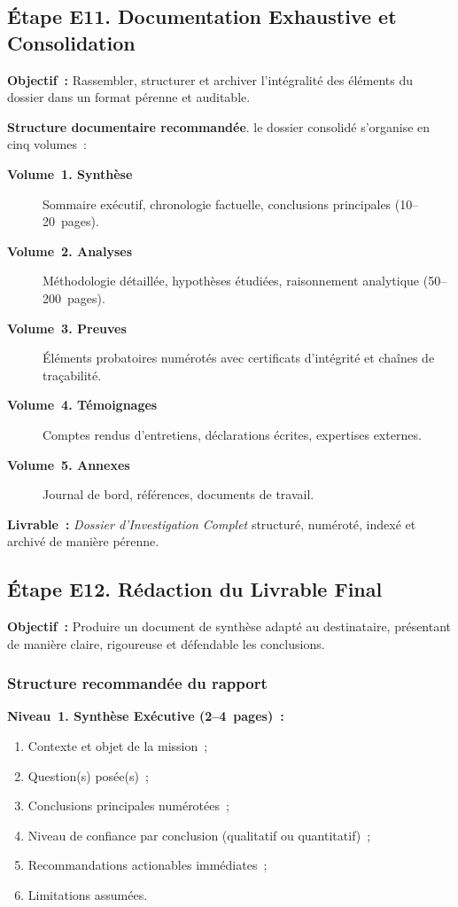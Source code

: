 \subsection{Étape E11. Documentation Exhaustive et Consolidation}

\textbf{Objectif~:} Rassembler, structurer et archiver l'intégralité des
éléments du dossier dans un format pérenne et auditable.

\textbf{Structure documentaire recommandée}. le dossier consolidé
s'organise en cinq volumes~:
\begin{description}
    \item[\textbf{Volume~1. Synthèse}] Sommaire exécutif, chronologie
          factuelle, conclusions principales (10--20~pages).
    \item[\textbf{Volume~2. Analyses}] Méthodologie détaillée, hypothèses
          étudiées, raisonnement analytique (50--200~pages).
    \item[\textbf{Volume~3. Preuves}] Éléments probatoires numérotés avec
          certificats d'intégrité et chaînes de traçabilité.
    \item[\textbf{Volume~4. Témoignages}] Comptes rendus d'entretiens,
          déclarations écrites, expertises externes.
    \item[\textbf{Volume~5. Annexes}] Journal de bord, références,
          documents de travail.
\end{description}

\textbf{Livrable~:} \textit{Dossier d'Investigation Complet} structuré,
numéroté, indexé et archivé de manière pérenne.

\subsection{Étape E12. Rédaction du Livrable Final}

\textbf{Objectif~:} Produire un document de synthèse adapté au destinataire,
présentant de manière claire, rigoureuse et défendable les conclusions.

\subsubsection*{Structure recommandée du rapport}

\textbf{Niveau~1. Synthèse Exécutive (2--4~pages)~:}
\begin{enumerate}
    \item Contexte et objet de la mission~;
    \item Question(s) posée(s)~;
    \item Conclusions principales numérotées~;
    \item Niveau de confiance par conclusion (qualitatif ou quantitatif)~;
    \item Recommandations actionables immédiates~;
    \item Limitations assumées.
\end{enumerate}

